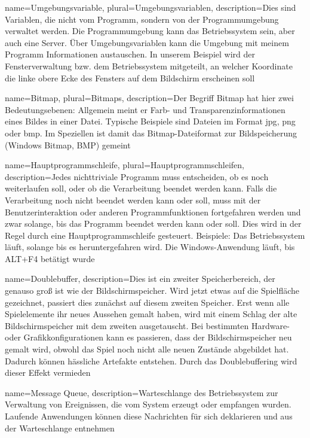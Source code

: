 {
  name={Umgebungsvariable},
  plural={Umgebungsvariablen},
  description={Dies sind Variablen, die nicht vom Programm, sondern von der Programmumgebung verwaltet werden. Die Programmumgebung kann das Betriebssystem sein, aber auch eine Server. Über Umgebungsvariablen kann die Umgebung mit meinem Programm Informationen austauschen. In unserem Beispiel wird der Fensterverwaltung bzw. dem Betriebssystem mitgeteilt, an welcher Koordinate die linke obere Ecke des Fensters auf dem Bildschirm erscheinen soll} 
}


{
  name={Bitmap},
  plural={Bitmaps},
  description={Der Begriff Bitmap hat hier zwei Bedeutungsebenen: Allgemein meint er Farb- und Transparenzinformationen eines Bildes in einer Datei. Typische Beispiele sind Dateien im Format \Gls{jpg}, \Gls{png} oder \Gls{bmp}. Im Speziellen ist damit das Bitmap-Dateiformat zur Bildspeicherung (Windows Bitmap, BMP) gemeint} 
}

{
  name={Hauptprogrammschleife},
  plural={Hauptprogrammschleifen},
  description={Jedes nichttriviale Programm muss entscheiden, ob es noch weiterlaufen soll, oder ob die Verarbeitung beendet werden kann. Falls die Verarbeitung noch nicht beendet werden kann oder soll, muss mit der Benutzerinteraktion oder anderen Programmfunktionen fortgefahren werden und zwar solange, bis das Programm beendet werden kann oder soll. Dies wird in der Regel durch eine Hauptprogrammschleife gesteuert. Beispiele: Das Betriebssystem läuft, solange bis es heruntergefahren wird. Die Windows-Anwendung läuft, bis ALT+F4 betätigt wurde} 
}

{
  name={Doublebuffer},
  description={Dies ist ein zweiter Speicherbereich, der genauso groß ist wie der Bildschirmspeicher. Wird jetzt etwas auf die Spielfläche gezeichnet, passiert dies zunächst auf diesem zweiten Speicher. Erst wenn alle Spielelemente ihr neues Aussehen gemalt haben, wird mit einem Schlag der alte Bildschirmspeicher mit dem zweiten ausgetauscht. Bei bestimmten Hardware- oder Grafikkonfigurationen kann es passieren, dass der Bildschirmspeicher neu gemalt wird, obwohl das Spiel noch nicht alle neuen Zustände abgebildet hat. Dadurch können hässliche Artefakte entstehen. Durch das Doublebuffering wird dieser Effekt vermieden} 
}

{
  name={Message Queue},
  description={Warteschlange des Betriebssystem zur Verwaltung von Ereignissen, die vom System erzeugt oder empfangen wurden. Laufende Anwendungen können diese Nachrichten für sich deklarieren und aus der Warteschlange entnehmen} 
}

